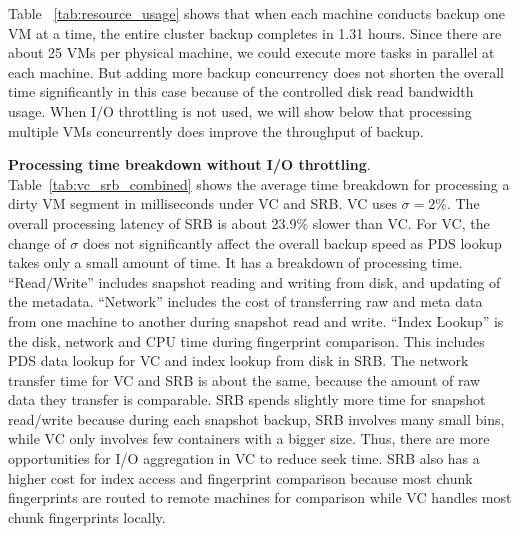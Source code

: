 Table ~\ref{tab:resource_usage} shows that when  each machine conducts
backup one VM at a time, the entire cluster backup 
completes in 1.31 hours. Since there are about 25 VMs per physical machine, we could execute
more tasks in parallel at each machine. But adding more backup concurrency does 
not shorten the overall time
significantly in this case because of the controlled  disk read bandwidth usage.
When I/O throttling is not used, we will show below that processing multiple VMs concurrently 
does improve the throughput of backup.


 

{\bf Processing time breakdown without I/O throttling}.
Table~\ref{tab:vc_srb_combined} shows
the  average  time breakdown for processing a dirty VM segment in milliseconds
under VC and SRB.
VC uses $\sigma=2\%$. 
The overall processing latency of SRB is about 23.9\% slower than VC.
For VC, the change of $\sigma$ does not significantly affect the overall backup speed as
PDS lookup takes only a small amount of time. 
It has a breakdown of processing time.
``Read/Write'' includes snapshot reading and writing from disk, and 
updating of the metadata.
``Network'' includes the cost of transferring raw and meta data from one machine to another during 
snapshot read and write.
``Index Lookup'' is the disk, network and CPU time during fingerprint comparison.
This includes PDS data lookup for VC and index lookup from disk in SRB. 
The network transfer time for VC and SRB is about the same, because the 
amount of raw data they transfer is comparable.
SRB spends slightly more time for snapshot read/write because during each snapshot  backup, SRB involves many small bins,
 while VC only involves few containers with a bigger size. Thus, there are more opportunities for I/O aggregation in VC to reduce seek time.
SRB also has a higher cost for index access and fingerprint comparison because most chunk fingerprints are routed
to remote machines for comparison while   VC handles most chunk fingerprints locally. 

